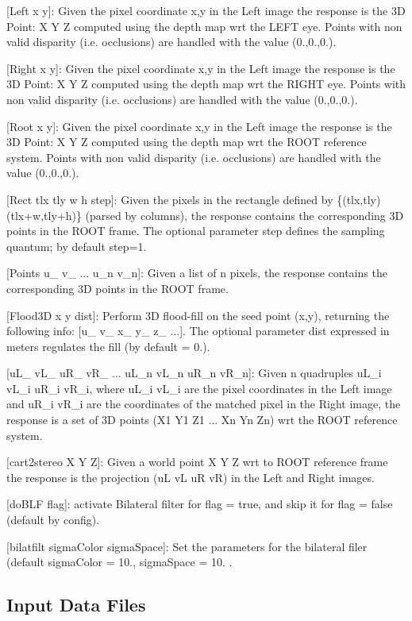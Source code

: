 \begin{DoxyItemize}
\begin{DoxyItemize}
\item \mbox{[}Left x y\mbox{]}\+: Given the pixel coordinate x,y in the Left image the response is the 3D Point\+: X Y Z computed using the depth map wrt the L\+E\+FT eye. Points with non valid disparity (i.\+e. occlusions) are handled with the value (0.,0.,0.).
\item \mbox{[}Right x y\mbox{]}\+: Given the pixel coordinate x,y in the Left image the response is the 3D Point\+: X Y Z computed using the depth map wrt the R\+I\+G\+HT eye. Points with non valid disparity (i.\+e. occlusions) are handled with the value (0.,0.,0.).
\item \mbox{[}Root x y\mbox{]}\+: Given the pixel coordinate x,y in the Left image the response is the 3D Point\+: X Y Z computed using the depth map wrt the R\+O\+OT reference system. Points with non valid disparity (i.\+e. occlusions) are handled with the value (0.,0.,0.).
\item \mbox{[}Rect tlx tly w h step\mbox{]}\+: Given the pixels in the rectangle defined by \{(tlx,tly) (tlx+w,tly+h)\} (parsed by columns), the response contains the corresponding 3D points in the R\+O\+OT frame. The optional parameter step defines the sampling quantum; by default step=1.
\item \mbox{[}Points u\+\_ v\+\_ ... u\+\_\+n v\+\_\+n\mbox{]}\+: Given a list of n pixels, the response contains the corresponding 3D points in the R\+O\+OT frame.
\item \mbox{[}Flood3D x y dist\mbox{]}\+: Perform 3D flood-\/fill on the seed point (x,y), returning the following info\+: \mbox{[}u\+\_ v\+\_ x\+\_ y\+\_ z\+\_ ...\mbox{]}. The optional parameter dist expressed in meters regulates the fill (by default = 0.).
\item \mbox{[}u\+L\+\_ v\+L\+\_ u\+R\+\_ v\+R\+\_ ... u\+L\+\_\+n v\+L\+\_\+n u\+R\+\_\+n v\+R\+\_\+n\mbox{]}\+: Given n quadruples u\+L\+\_\+i v\+L\+\_\+i u\+R\+\_\+i v\+R\+\_\+i, where u\+L\+\_\+i v\+L\+\_\+i are the pixel coordinates in the Left image and u\+R\+\_\+i v\+R\+\_\+i are the coordinates of the matched pixel in the Right image, the response is a set of 3D points (X1 Y1 Z1 ... Xn Yn Zn) wrt the R\+O\+OT reference system.
\item \mbox{[}cart2stereo X Y Z\mbox{]}\+: Given a world point X Y Z wrt to R\+O\+OT reference frame the response is the projection (uL vL uR vR) in the Left and Right images.
\item \mbox{[}do\+B\+LF flag\mbox{]}\+: activate Bilateral filter for flag = true, and skip it for flag = false (default by config).
\item \mbox{[}bilatfilt sigma\+Color sigma\+Space\mbox{]}\+: Set the parameters for the bilateral filer (default sigma\+Color = 10., sigma\+Space = 10. .
\end{DoxyItemize}
\end{DoxyItemize}\hypertarget{group__SFM_in_files_sec}{}\subsection{Input Data Files}\label{group__SFM_in_files_sec}
